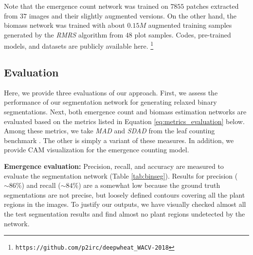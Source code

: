 \documentclass[10pt,twocolumn,letterpaper]{article}
\begin{document}
Note that the emergence count network was trained on $7855$ patches extracted from $37$ images and their slightly augmented versions. On the other hand, the biomass network was trained with about $0.15M$ augmented training samples generated by the \textit{RMRS} algorithm from $48$ plot samples. Codes, pre-trained models, and datasets are publicly available here. \footnote{\texttt{https://github.com/p2irc/deepwheat\_WACV{-}2018}}%

\subsection{Evaluation}

Here, we provide three evaluations of our approach. First, we assess the performance of our segmentation network for generating relaxed binary segmentations. Next, both emergence count and biomass estimation networks are evaluated based on the metrics listed in Equation \ref{eq:metrics_evaluation} below. Among these metrics, we take \textit{MAD} and \textit{SDAD} from the leaf counting benchmark \cite{aich-cvppp2017}. The other is simply a variant of these measures. In addition, we provide CAM visualization for the emergence counting model.

\begin{table}[!htbp]
\caption{Binary segmentation results}
\label{tab:binseg}
\end{table}

\textbf{Emergence evaluation: } Precision, recall, and accuracy are measured to evaluate the segmentation network (Table \ref{tab:binseg}). Results for precision ($\sim86\%$) and recall ($\sim84\%$) are a somewhat low because the ground truth segmentations are not precise, but loosely defined contours covering all the plant regions in the images. To justify our outputs, we have visually checked almost all the test segmentation results and find almost no plant regions undetected by the network.
\end{document}

